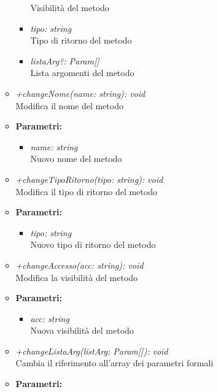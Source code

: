 \begin{itemize}
\begin{itemize}
\begin{itemize}
            					Visibilità del metodo
            					\item \emph{tipo: string}\\
            					Tipo di ritorno del metodo
            					\item \emph{listaArg?: Param[]}\\
            					Lista argomenti del metodo
            				\end{itemize}
          				\item \emph{+changeNome(name: string): void}\\
          				Modifica il nome del metodo
          				\item \textbf{Parametri:}\\
            				\begin{itemize}
            					\item \emph{name: string}\\
            					Nuovo nome del metodo
            				\end{itemize}
          				\item \emph{+changeTipoRitorno(tipo: string): void}\\
          				Modifica il tipo di ritorno del metodo
          				\item \textbf{Parametri:}\\
            				\begin{itemize}
            					\item \emph{tipo: string}\\
            					Nuovo tipo di ritorno del metodo
            				\end{itemize}
          				\item \emph{+changeAccesso(acc: string): void}\\
          				Modifica la visibilità del metodo
          				\item \textbf{Parametri:}\\
            				\begin{itemize}
            					\item \emph{acc: string}\\
            					Nuova visibilità del metodo
            				\end{itemize}          				
          				\item \emph{+changeListaArg(listArg: Param[]): void}\\
          				 Cambia il riferimento all'array dei parametri formali
          				 \item \textbf{Parametri:}\\

\end{itemize}
\end{itemize}
